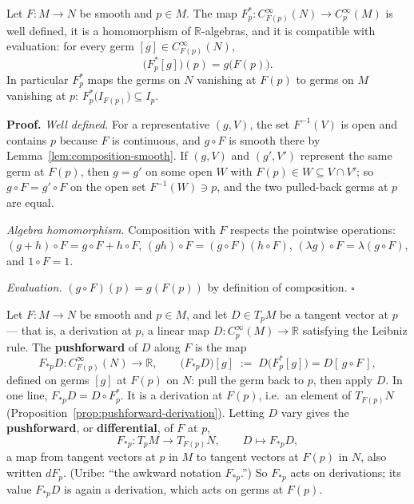 \documentclass[11pt]{report}
\makeatletter
\newcounter{defcounter}[section]
\newcounter{thmcounter}[section]
\renewenvironment{proof}[1][Proof]{\noindent\textbf{#1.} }{\hfill$\square$\par\vspace{5pt}}
\newcommand{\thmlabel}[1]{\edef\@currentlabel{\arabic{section}.\arabic{thmcounter}}\label{#1}}
\newcommand{\deflabel}[1]{\edef\@currentlabel{\arabic{section}.\arabic{defcounter}}\label{#1}}
\newcommand{\leeref}[1]{\par\smallskip{\raggedleft\footnotesize\textsc{Lee}:\ #1\par}}
\makeatother
\begin{document}
\begin{propbox}\thmlabel{prop:pullback-properties}
Let $F : M \to N$ be smooth and $p \in M$. The map $F_p^* : C^\infty_{F(p)}(N) \to C^\infty_p(M)$ is well defined, it is a homomorphism of $\mathbb{R}$-algebras, and it is compatible with evaluation: for every germ $[g] \in C^\infty_{F(p)}(N)$,
\[
\big(F_p^*[g]\big)(p) = g\big(F(p)\big).
\]
In particular $F_p^*$ maps the germs on $N$ vanishing at $F(p)$ to germs on $M$ vanishing at $p$: $F_p^*\big(I_{F(p)}\big) \subseteq I_p$.
\end{propbox}

\begin{proof}
\emph{Well defined.} For a representative $(g, V)$, the set $F^{-1}(V)$ is open and contains $p$ because $F$ is continuous, and $g \circ F$ is smooth there by Lemma~\ref{lem:composition-smooth}. If $(g, V)$ and $(g', V')$ represent the same germ at $F(p)$, then $g = g'$ on some open $W$ with $F(p) \in W \subseteq V \cap V'$; so $g \circ F = g' \circ F$ on the open set $F^{-1}(W) \ni p$, and the two pulled-back germs at $p$ are equal.

\emph{Algebra homomorphism.} Composition with $F$ respects the pointwise operations: $(g + h)\circ F = g \circ F + h \circ F$, $(gh) \circ F = (g\circ F)(h \circ F)$, $(\lambda g)\circ F = \lambda (g \circ F)$, and $1 \circ F = 1$.

\emph{Evaluation.} $(g \circ F)(p) = g(F(p))$ by definition of composition.
\end{proof}

\begin{defbox}\deflabel{def:pushforward}
Let $F : M \to N$ be smooth and $p \in M$, and let $D \in T_pM$ be a tangent vector at $p$ --- that is, a derivation at $p$, a linear map $D : C^\infty_p(M) \to \mathbb{R}$ satisfying the Leibniz rule. The \textbf{pushforward} of $D$ along $F$ is the map
\[
F_{*p}D : C^\infty_{F(p)}(N) \longrightarrow \mathbb{R}, \qquad \big(F_{*p}D\big)[g] \;:=\; D\big(F_p^*[g]\big) = D[\,g \circ F\,],
\]
defined on germs $[g]$ at $F(p)$ on $N$: pull the germ back to $p$, then apply $D$. In one line, $F_{*p}D = D \circ F_p^*$. It is a derivation at $F(p)$, i.e.\ an element of $T_{F(p)}N$ (Proposition~\ref{prop:pushforward-derivation}). Letting $D$ vary gives the \textbf{pushforward}, or \textbf{differential}, of $F$ at $p$,
\[
F_{*p} : T_pM \longrightarrow T_{F(p)}N, \qquad D \longmapsto F_{*p}D,
\]
a map from tangent vectors at $p$ in $M$ to tangent vectors at $F(p)$ in $N$, also written $dF_p$. (Uribe: ``the awkward notation $F_{*p}$.'') So $F_{*p}$ acts on derivations; its value $F_{*p}D$ is again a derivation, which acts on germs at $F(p)$.
\leeref{Ch.~3, \emph{The Differential of a Smooth Map}}
\end{defbox}
\end{document}
